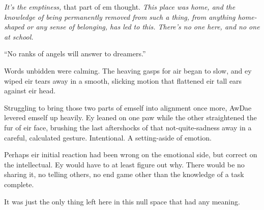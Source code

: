 \emph{It's the emptiness,} that part of em thought. \emph{This place was home, and the knowledge of being permanently removed from such a thing, from anything home-shaped or any sense of belonging, has led to this. There's no one here, and no one at school.}

``No ranks of angels will answer to dreamers.''

Words unbidden were calming. The heaving gasps for air began to slow, and ey wiped eir tears away in a smooth, slicking motion that flattened eir tall ears against eir head.

Struggling to bring those two parts of emself into alignment once more, AwDae levered emself up heavily. Ey leaned on one paw while the other straightened the fur of eir face, brushing the last aftershocks of that not-quite-sadness away in a careful, calculated gesture. Intentional. A setting-aside of emotion.

Perhaps eir initial reaction had been wrong on the emotional side, but correct on the intellectual. Ey would have to at least figure out why. There would be no sharing it, no telling others, no end game other than the knowledge of a task complete.

It was just the only thing left here in this null space that had any meaning.
